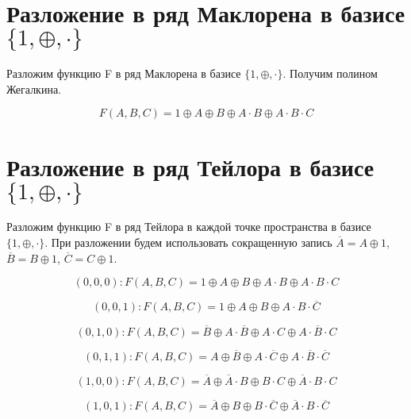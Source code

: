 \documentclass[a4paper,10pt]{article} %
\begin{document}
	\section{Разложение в ряд Маклорена в базисе $\{1, \oplus, \cdot\}$}
	Разложим функцию F в ряд Маклорена в базисе $\{1, \oplus, \cdot\}$.
	Получим полином Жегалкина.
	
	\begin{equation}
		F(A, B, C) = 1 \oplus A \oplus B \oplus A \cdot B 
		\oplus A \cdot B\cdot C
	\end{equation}
	
	\section{Разложение в ряд Тейлора в базисе $\{1, \oplus, \cdot\}$}
	Разложим функцию F в ряд Тейлора в каждой точке пространства в базисе
	$\{1, \oplus, \cdot\}$. При разложении будем использовать сокращенную запись 
	$\overline{A} = A \oplus 1$, $\overline{B} = B \oplus 1$, 
	$\overline{C} = C \oplus 1$. 
	
	\begin{equation}
	(0, 0, 0): F(A, B, C) = 1 \oplus A \oplus B \oplus A \cdot B 
	\oplus A \cdot B\cdot C
	\end{equation}
	
	\begin{equation}
	(0, 0, 1): F(A, B, C) = 1 \oplus A \oplus B \oplus 
	A \cdot B \cdot \overline{C}
	\end{equation}
	
	\begin{equation}
	(0, 1, 0): F(A, B, C) = \overline{B} \oplus A \cdot \overline{B}
	\oplus A \cdot C \oplus A \cdot \overline{B} \cdot C 
	\end{equation}
	
	\begin{equation}
	(0, 1, 1): F(A, B, C) = A \oplus \overline{B} \oplus A \cdot \overline{C} \oplus A \cdot \overline{B} \cdot \overline{C}
	\end{equation}
	
	\begin{equation}
	(1, 0, 0): F(A, B, C) = \overline{A} \oplus \overline{A} \cdot B
	 \oplus B \cdot C \oplus \overline{A} \cdot B \cdot C
	\end{equation}
	
	\begin{equation}
	(1, 0, 1): F(A, B, C) = \overline{A} \oplus B \oplus B \cdot \overline{C} 
	\oplus \overline{A} \cdot B \cdot \overline{C}
	\end{equation}
	
\end{document}
